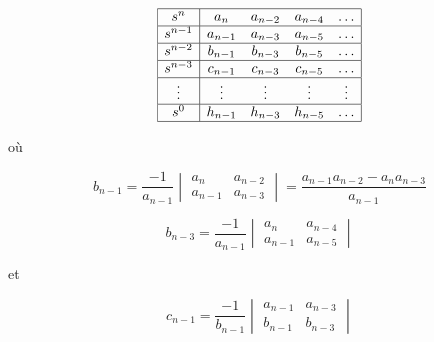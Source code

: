 \documentclass[a4paper,11pt]{article}
\begin{document}
\[
\begin{array}{|c|c c c c|}
    \hline
    s^n & a_n & a_{n-2} & a_{n-4} & \dots \\
    \hline
    s^{n-1} & a_{n-1} & a_{n-3} & a_{n-5} & \dots \\
    \hline
    s^{n-2} & b_{n-1} & b_{n-3} & b_{n-5} & \dots \\
    \hline
    s^{n-3} & c_{n-1} & c_{n-3} & c_{n-5} & \dots \\
    \hline
    \vdots & \vdots & \vdots & \vdots & \vdots \\
    \hline
    s^0 & h_{n-1} & h_{n-3} & h_{n-5} & \dots \\
    \hline
\end{array}
\]

où

\[
b_{n-1} = \frac{-1}{a_{n-1}}
\begin{vmatrix}
    a_n & a_{n-2} \\
    a_{n-1} & a_{n-3}
\end{vmatrix}
= \frac{a_{n-1} a_{n-2} - a_n a_{n-3}}{a_{n-1}}
\]

\[
b_{n-3} = \frac{-1}{a_{n-1}}
\begin{vmatrix}
    a_n & a_{n-4} \\
    a_{n-1} & a_{n-5}
\end{vmatrix}
\]

et

\[
c_{n-1} = \frac{-1}{b_{n-1}}
\begin{vmatrix}
    a_{n-1} & a_{n-3} \\
    b_{n-1} & b_{n-3}
\end{vmatrix}
\]
\end{document}
